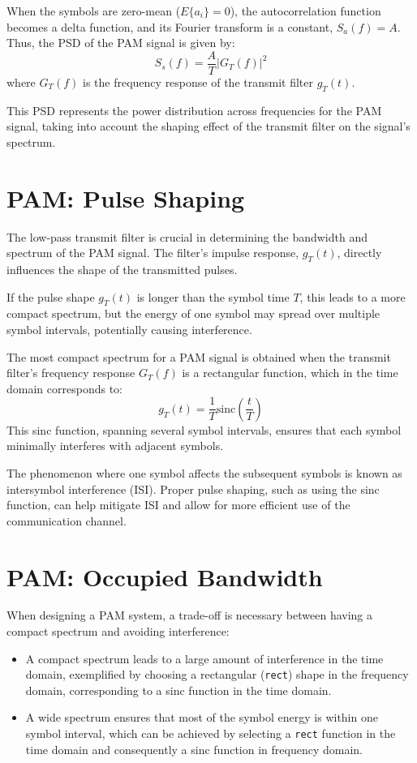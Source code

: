 When the symbols are zero-mean (\( E\{a_i\} = 0 \)), the autocorrelation function becomes a delta function, and its Fourier transform is a constant, \( S_a(f) = A \). Thus, the PSD of the PAM signal is given by:
\[ S_s(f) = \frac{A}{T} |G_T(f)|^2 \]
where \( G_T(f) \) is the frequency response of the transmit filter \( g_T(t) \).

This PSD represents the power distribution across frequencies for the PAM signal, taking into account the shaping effect of the transmit filter on the signal's spectrum.


\section*{PAM: Pulse Shaping}

The low-pass transmit filter is crucial in determining the bandwidth and spectrum of the PAM signal. The filter's impulse response, \( g_T(t) \), directly influences the shape of the transmitted pulses.

If the pulse shape \( g_T(t) \) is longer than the symbol time \( T \), this leads to a more compact spectrum, but the energy of one symbol may spread over multiple symbol intervals, potentially causing interference.

The most compact spectrum for a PAM signal is obtained when the transmit filter's frequency response \( G_T(f) \) is a rectangular function, which in the time domain corresponds to:
\[ g_T(t) = \frac{1}{T} \text{sinc}\left( \frac{t}{T} \right) \]
This sinc function, spanning several symbol intervals, ensures that each symbol minimally interferes with adjacent symbols.

The phenomenon where one symbol affects the subsequent symbols is known as intersymbol interference (ISI). Proper pulse shaping, such as using the sinc function, can help mitigate ISI and allow for more efficient use of the communication channel.


\section*{PAM: Occupied Bandwidth}

When designing a PAM system, a trade-off is necessary between having a compact spectrum and avoiding interference:
\begin{itemize}
    \item A compact spectrum leads to a large amount of interference in the time domain, exemplified by choosing a rectangular (\texttt{rect}) shape in the frequency domain, corresponding to a sinc function in the time domain.
    \item A wide spectrum ensures that most of the symbol energy is within one symbol interval, which can be achieved by selecting a \texttt{rect} function in the time domain and consequently a sinc function in frequency domain.
\end{itemize}

